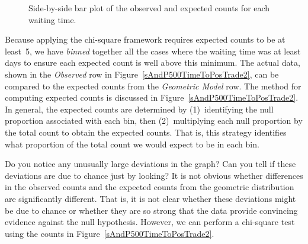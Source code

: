 \begin{figure}
  \centering
  \caption{Side-by-side bar plot of the observed
      and expected counts for each waiting time.}
  \label{geomFitEvaluationForSP500}
\end{figure}

Because applying the chi-square framework requires expected counts
to be at least~5, we have \emph{binned} together all the cases
where the waiting time was at least \spdaysN{} days to ensure each
expected count is well above this minimum.
The actual data, shown in the \emph{Observed} row in
Figure~\ref{sAndP500TimeToPosTrade2}, can be compared to the
expected counts from the \emph{Geometric Model} row.
The method for computing expected counts is discussed in
Figure~\ref{sAndP500TimeToPosTrade2}.
In general, the expected counts are determined by
(1)~identifying the null proportion associated with each bin,
then (2)~multiplying each null proportion by the total count
to obtain the expected counts.
That is, this strategy identifies what proportion of the total
count we would expect to be in each bin.

\begin{examplewrap}
\begin{nexample}{Do you notice any unusually large deviations
    in the graph?
    Can you tell if these deviations are due to chance just
    by looking?}
  It is not obvious whether differences in the observed counts
  and the expected counts from the geometric distribution are
  significantly different.
  That is, it is not clear whether these deviations might be
  due to chance or whether they are so strong that the data
  provide convincing evidence against the null hypothesis.
  However, we can perform a chi-square test using the counts
  in Figure~\ref{sAndP500TimeToPosTrade2}.
\end{nexample}
\end{examplewrap}

